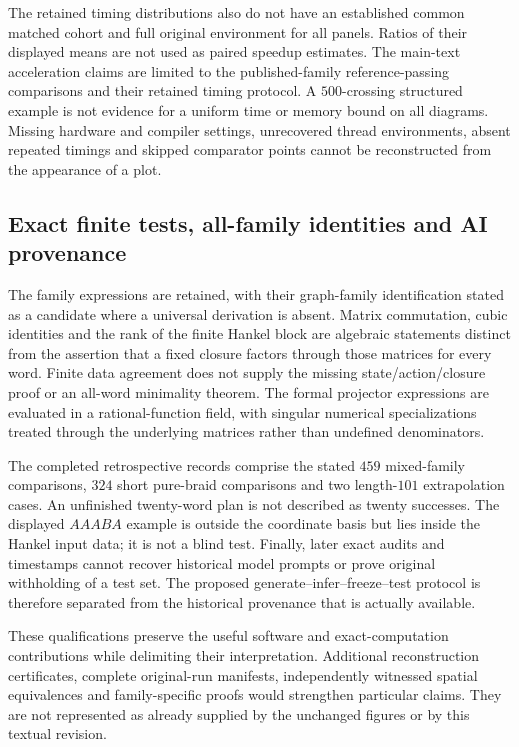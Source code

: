 \documentclass[10pt,twocolumn]{article}
\begin{document}
The retained timing distributions also do not have an established common matched cohort and full original environment for all panels. Ratios of their displayed means are not used as paired speedup estimates. The main-text acceleration claims are limited to the published-family reference-passing comparisons and their retained timing protocol. A $500$-crossing structured example is not evidence for a uniform time or memory bound on all diagrams. Missing hardware and compiler settings, unrecovered thread environments, absent repeated timings and skipped comparator points cannot be reconstructed from the appearance of a plot.

\subsection{Exact finite tests, all-family identities and AI provenance}
\label{supp:limitations_discovery}
The family expressions are retained, with their graph-family identification stated as a candidate where a universal derivation is absent. Matrix commutation, cubic identities and the rank of the finite Hankel block are algebraic statements distinct from the assertion that a fixed closure factors through those matrices for every word. Finite data agreement does not supply the missing state/action/closure proof or an all-word minimality theorem. The formal projector expressions are evaluated in a rational-function field, with singular numerical specializations treated through the underlying matrices rather than undefined denominators.

The completed retrospective records comprise the stated $459$ mixed-family comparisons, $324$ short pure-braid comparisons and two length-$101$ extrapolation cases. An unfinished twenty-word plan is not described as twenty successes. The displayed $AAABA$ example is outside the coordinate basis but lies inside the Hankel input data; it is not a blind test. Finally, later exact audits and timestamps cannot recover historical model prompts or prove original withholding of a test set. The proposed generate--infer--freeze--test protocol is therefore separated from the historical provenance that is actually available.

These qualifications preserve the useful software and exact-computation contributions while delimiting their interpretation. Additional reconstruction certificates, complete original-run manifests, independently witnessed spatial equivalences and family-specific proofs would strengthen particular claims. They are not represented as already supplied by the unchanged figures or by this textual revision.
\end{document}
